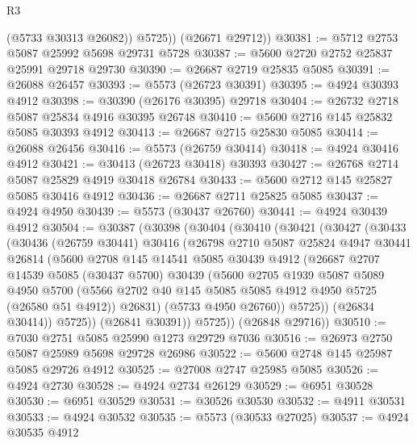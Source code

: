 \begin{lexlean}{R3}
\begin{coremodule}
            (@5733 @30313 @26082))
          @5725))
      (@26671 @29712))
@30381 := @5712 @2753 @5087 @25992 @5698 @29731 @5728
@30387 := @5600 @2720 @2752 @25837 @25991 @29718 @29730
@30390 := @26687 @2719 @25835 @5085
@30391 := @26088 @26457
@30393 := @5573 (@26723 @30391)
@30395 := @4924 @30393 @4912
@30398 := @30390 (@26176 @30395) @29718
@30404 := @26732 @2718 @5087 @25834 @4916 @30395 @26748
@30410 := @5600 @2716 @145 @25832 @5085 @30393 @4912
@30413 := @26687 @2715 @25830 @5085
@30414 := @26088 @26456
@30416 := @5573 (@26759 @30414)
@30418 := @4924 @30416 @4912
@30421 := @30413 (@26723 @30418) @30393
@30427 := @26768 @2714 @5087 @25829 @4919 @30418 @26784
@30433 := @5600 @2712 @145 @25827 @5085 @30416 @4912
@30436 := @26687 @2711 @25825 @5085
@30437 := @4924 @4950
@30439 := @5573 (@30437 @26760)
@30441 := @4924 @30439 @4912
@30504 := @30387
    (@30398
      (@30404
        (@30410
          (@30421
            (@30427
              (@30433
                (@30436
                  (@26759 @30441)
                  @30416
                  (@26798
                    @2710
                    @5087
                    @25824
                    @4947
                    @30441
                    @26814
                    (@5600
                      @2708
                      @145
                      @14541
                      @5085
                      @30439
                      @4912
                      (@26687
                        @2707
                        @14539
                        @5085
                        (@30437 @5700)
                        @30439
                        (@5600
                          @2705
                          @1939
                          @5087
                          @5089
                          @4950
                          @5700
                          (@5566 @2702 @40 @145 @5085 @5085 @4912 @4950 @5725 (@26580 @51 @4912))
                          @26831)
                        (@5733 @4950 @26760))
                      @5725))
                  (@26834 @30414))
                @5725))
            (@26841 @30391))
          @5725))
      (@26848 @29716))
@30510 := @7030 @2751 @5085 @25990 @1273 @29729 @7036
@30516 := @26973 @2750 @5087 @25989 @5698 @29728 @26986
@30522 := @5600 @2748 @145 @25987 @5085 @29726 @4912
@30525 := @27008 @2747 @25985 @5085
@30526 := @4924 @2730
@30528 := @4924 @2734 @26129
@30529 := @6951 @30528
@30530 := @6951 @30529
@30531 := @30526 @30530
@30532 := @4911 @30531
@30533 := @4924 @30532
@30535 := @5573 (@30533 @27025)
@30537 := @4924 @30535 @4912

\end{coremodule}
\end{lexlean}
